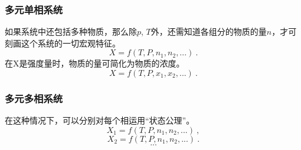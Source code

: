 \subsubsection{多元单相系统}
如果系统中还包括多种物质，那么除$p$, $T$外，还需知道各组分的物质的量$n$，才可刻画这个系统的一切宏观特征。
\begin{equation}
X=f(T,P,n_1, n_2, ...)~.
\end{equation}
在X是强度量时，物质的量可简化为物质的浓度。
\begin{equation}
X=f(T,P,x_1, x_2, ...)~.
\end{equation}

\subsubsection{多元多相系统}
在这种情况下，可以分别对每个相运用“状态公理”。
\begin{equation}
X_1=f(T,P,n_1, n_2, ...)~,
\end{equation}
\begin{equation}
X_2=f(T,P,n_1, n_2, ...)~.
\end{equation}
$$...$$
